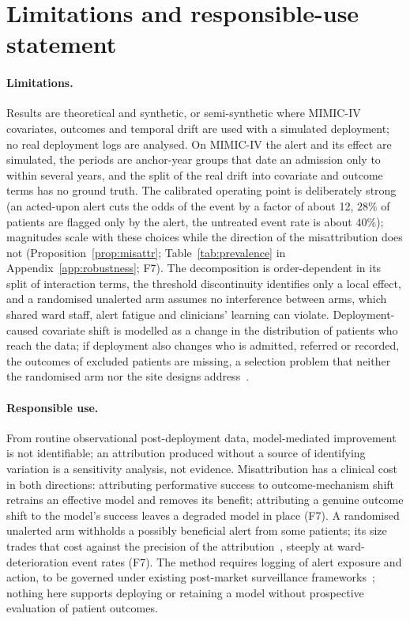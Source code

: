 \documentclass[letterpaper]{article} %
\begin{document}
\section{Limitations and responsible-use statement}
\label{sec:responsible}

\paragraph{Limitations.} Results are theoretical and synthetic, or
semi-synthetic where MIMIC-IV covariates, outcomes and temporal drift are used
with a simulated deployment; no real deployment logs are analysed. On MIMIC-IV
the alert and its effect are simulated, the periods are anchor-year groups
that date an admission only to within several years, and the split of the
real drift into covariate and outcome terms has no ground truth. The
calibrated operating point is deliberately strong (an acted-upon alert cuts
the odds of the event by a factor of about 12, $28\%$ of patients are flagged only by the
alert, the untreated event rate is about $40\%$); magnitudes scale with these
choices while the direction of the misattribution does not
(Proposition~\ref{prop:misattr}; Table~\ref{tab:prevalence} in
Appendix~\ref{app:robustness}; F7). The
decomposition is order-dependent in its split of interaction terms, the
threshold discontinuity identifies only a local effect, and a randomised
unalerted arm assumes no interference between arms, which shared ward staff,
alert fatigue and clinicians' learning can violate. Deployment-caused
covariate shift is modelled as a change in the distribution of patients who
reach the data; if deployment also changes who is admitted, referred or
recorded, the outcomes of excluded patients are missing, a selection problem
that neither the randomised arm nor the site designs
address~\citep{papadogeorgou2025selection}.

\paragraph{Responsible use.} From routine observational post-deployment data,
model-mediated improvement is not identifiable; an attribution produced
without a source of identifying variation is a sensitivity analysis, not
evidence. Misattribution has a clinical cost in both directions: attributing
performative success to outcome-mechanism shift retrains an effective model
and removes its benefit; attributing a genuine outcome shift to the model's
success leaves a degraded model in place (F7). A randomised unalerted
arm withholds a possibly beneficial alert from some patients; its size trades
that cost against the precision of the
attribution~\citep{haidarwehbe2025holdout}, steeply at ward-deterioration
event rates (F7). The method requires logging of alert
exposure and action, to be governed under existing post-market surveillance
frameworks~\citep{gonzalez2024regulating}; nothing here supports deploying
or retaining a model without prospective evaluation of patient outcomes.
\end{document}
